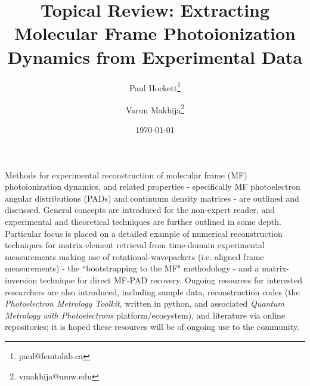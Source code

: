 \documentclass[10pt]{article}
\renewenvironment{abstract}
  {{\bfseries\noindent{\abstractname}\par\nobreak}\footnotesize}
  {\bigskip}
\begin{document}
\title{%
Topical Review: Extracting Molecular Frame Photoionization Dynamics from Experimental Data
}

\author[1]{Paul Hockett\thanks{paul@femtolab.ca} }%
\author[2]{Varun Makhija\thanks{vmakhija@umw.edu} }
%
%

\vspace{-1em}

\date{\today}


\begingroup
\let\center\flushleft
\let\endcenter\endflushleft
\maketitle
\endgroup


\begin{abstract}Methods for experimental reconstruction of molecular frame (MF) photoionization dynamics, and related properties - specifically MF photoelectron angular distributions (PADs) and continuum density matrices - are outlined and discussed. General concepts are introduced for the non-expert reader, and experimental and theoretical techniques are further outlined in some depth. Particular focus is placed on a detailed example of numerical reconstruction techniques for matrix-element retrieval from time-domain experimental measurements making use of rotational-wavepackets (i.e. aligned frame measurements) - the ``bootstrapping to the MF" methodology - and a matrix-inversion technique for direct MF-PAD recovery. Ongoing resources for interested researchers are also introduced, including sample data, reconstruction codes (the \textit{Photoelectron Metrology Toolkit}, written in python, and associated \textit{Quantum Metrology with Photoelectrons} platform/ecosystem), and literature via online repositories; it is hoped these resources will be of ongoing use to the community.\end{abstract}

\tableofcontents


\end{document}
